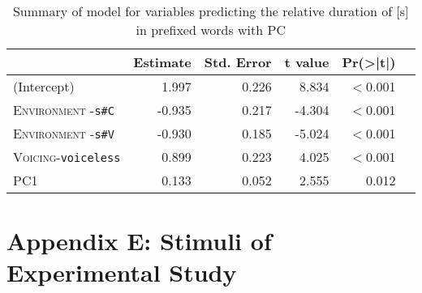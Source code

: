 \begin{table}[H]
	\centering
	\caption{ Summary of model for variables predicting the relative duration of [s] in prefixed words with PC}
	\label{model dis PC Corpus rel}

	\begin{tabular}{lrrrrr}
		\hline
		& Estimate                       & Std. Error            & t value & Pr(\textgreater|t|)  \\ \hline
(Intercept) & 1.997 & 0.226 & 8.834 & $<$0.001  \\ 
\textsc{Environment} -\texttt{s\#C}  & -0.935 & 0.217 & -4.304 &$<$0.001  \\ 
\textsc{Environment} -\texttt{s\#V} & -0.930 & 0.185 & -5.024 & $<$0.001  \\ 
\textsc{Voicing}-\texttt{voiceless} & 0.899 & 0.223 & 4.025 & $<$0.001 \\ 
\textsc{PC1} & 0.133 & 0.052 & 2.555 & 0.012 \\ 
		\hline	
	\end{tabular}
\end{table}


\clearpage

\section*{Appendix E: Stimuli of Experimental Study} \label{Appendix E: Stimuli of Experimental Study}




